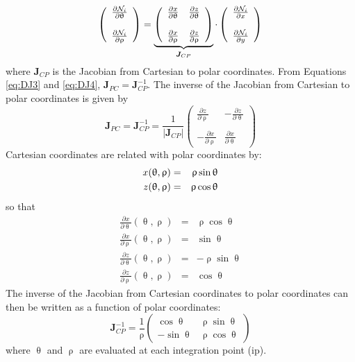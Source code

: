 \begin{equation}
\left(
\begin{array}{c}
\frac{\partial {\mathcal{N}}_i}{\partial \uptheta} \\ \\
\frac{\partial {\mathcal{N}}_i}{\partial \uprho} 
\end{array}
\right)
= 
\underbrace{\left(
\begin{array}{cc}
\frac{\partial x}{\partial \uptheta}  & 
\frac{\partial z}{\partial \uptheta}  \\ \\
\frac{\partial x}{\partial \uprho}   &
\frac{\partial z}{\partial \uprho}
\end{array}
\right)}_{{\bm J}_{CP}}
\cdot
\left(
\begin{array}{c}
\frac{\partial {\mathcal{N}}_i}{\partial x} \\ \\
\frac{\partial {\mathcal{N}}_i}{\partial y} 
\end{array}
\right)
\label{eq:DJ4}
\end{equation}
where ${\bm J}_{CP}$ is the Jacobian from Cartesian to polar coordinates. 
From Equations \eqref{eq:DJ3} and \eqref{eq:DJ4}, ${\bm J}_{PC}={\bm J}_{CP}^{-1} $. The inverse
of the Jacobian from Cartesian to polar coordinates is given by
\[
{\bm J}_{PC}= {\bm J}_{CP}^{-1}=
\frac{1}{|{\bm J}_{CP}|}
\left(
\begin{array}{cc}
\frac{\partial z}{\partial \uprho} & 
-\frac{\partial z}{\partial \uptheta}  \\ \\
-\frac{\partial x}{\partial \uprho}   &
\frac{\partial x}{\partial \uptheta}
\end{array}
\right)
\]
Cartesian coordinates are related with polar coordinates by:
\begin{eqnarray}
x(\uptheta,\uprho) &=& \uprho \sin \uptheta \nonumber\\
z(\uptheta,\uprho) &=& \uprho \cos \uptheta \nonumber
\end{eqnarray}
so that 
\begin{eqnarray}
\frac{\partial x}{\partial \uptheta} (\uptheta,\uprho) &=& \uprho \cos \uptheta \\
\frac{\partial x}{\partial \uprho} (\uptheta,\uprho) &=&  \sin \uptheta \\
\frac{\partial z}{\partial \uptheta} (\uptheta,\uprho) &=& -\uprho \sin \uptheta \\
\frac{\partial z}{\partial \uprho} (\uptheta,\uprho) &=& \cos \uptheta 
\end{eqnarray}
The inverse of the Jacobian from Cartesian coordinates to polar coordinates can then be written 
as a function of polar coordinates:
\begin{equation}
\boxed{
{\bm J}_{CP}^{-1} 
= 
\frac{1}{\uprho}
\left(
\begin{array}{cc}
\cos \uptheta & \uprho\sin\uptheta \\
-\sin\uptheta & \uprho\cos\uptheta
\end{array}
\right)}
\label{eq:DJ6}
\end{equation}
where $\uptheta$ and $\uprho$ are evaluated at each integration point (ip).

